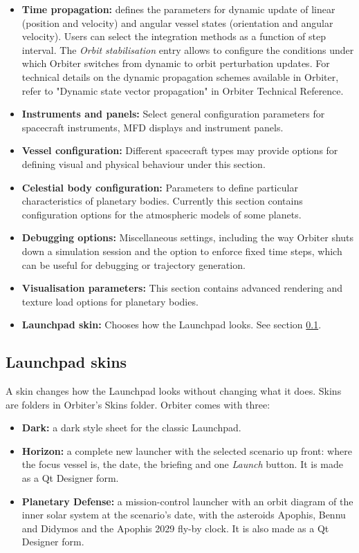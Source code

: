 \documentclass[Orbiter User Manual.tex]{subfiles}
\begin{document}
\begin{itemize}
\item \textbf{Time propagation:} defines the parameters for dynamic update of linear (position and velocity) and angular vessel states (orientation and angular velocity). Users can select the integration methods as a function of step interval. The \textit{Orbit stabilisation} entry allows to configure the conditions under which Orbiter switches from dynamic to orbit perturbation updates. For technical details on the dynamic propagation schemes available in Orbiter, refer to "Dynamic state vector propagation" in Orbiter Technical Reference.
\item \textbf{Instruments and panels:} Select general configuration parameters for spacecraft instruments, MFD displays and instrument panels.
\item \textbf{Vessel configuration:} Different spacecraft types may provide options for defining visual and physical behaviour under this section.
\item \textbf{Celestial body configuration:} Parameters to define particular characteristics of planetary bodies. Currently this section contains configuration options for the atmospheric models of some planets.
\item \textbf{Debugging options:} Miscellaneous settings, including the way Orbiter shuts down a simulation session and the option to enforce fixed time steps, which can be useful for debugging or trajectory generation.
\item \textbf{Visualisation parameters:} This section contains advanced rendering and texture load options for planetary bodies.
\item \textbf{Launchpad skin:} Chooses how the Launchpad looks. See section \ref{ssec:launchpad_skins}.
\end{itemize}


\subsection{Launchpad skins}
\label{ssec:launchpad_skins}
A skin changes how the Launchpad looks without changing what it does. Skins are folders in Orbiter's Skins folder. Orbiter comes with three:

\begin{itemize}
\item \textbf{Dark:} a dark style sheet for the classic Launchpad.
\item \textbf{Horizon:} a complete new launcher with the selected scenario up front: where the focus vessel is, the date, the briefing and one \textit{Launch} button. It is made as a Qt Designer form.
\item \textbf{Planetary Defense:} a mission-control launcher with an orbit diagram of the inner solar system at the scenario's date, with the asteroids Apophis, Bennu and Didymos and the Apophis 2029 fly-by clock. It is also made as a Qt Designer form.
\end{itemize}
\end{document}

